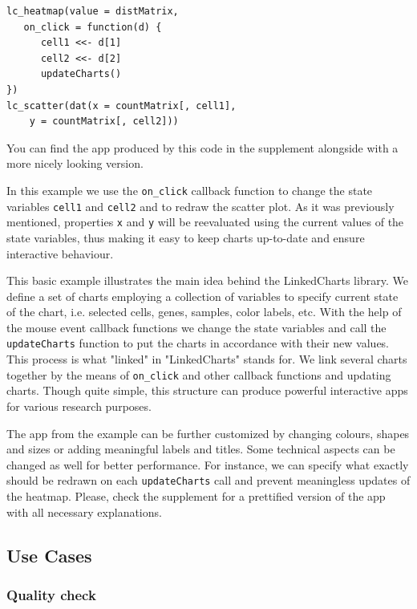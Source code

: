 \documentclass[twocolumn,10pt]{article}
\begin{document}
\begin{verbatim}
lc_heatmap(value = distMatrix, 
   on_click = function(d) {
      cell1 <<- d[1]
      cell2 <<- d[2]
      updateCharts()
})
lc_scatter(dat(x = countMatrix[, cell1],
	y = countMatrix[, cell2]))
\end{verbatim}

You can find the app produced by this code in the supplement alongside with a more nicely looking version.

In this example we use the \texttt{on_click} callback function to change the state variables \texttt{cell1} and \texttt{cell2} and to redraw the scatter plot. As it was previously mentioned, properties \texttt{x} and \texttt{y} will be reevaluated using the current values of the state variables, thus making it easy to keep charts up-to-date and ensure interactive behaviour.

This basic example illustrates the main idea behind the LinkedCharts library. We define a set of charts employing a collection of variables to specify current state of the chart, i.e. selected cells, genes, samples, color labels, etc. With the help of the mouse event callback functions we change the state variables and call the \texttt{updateCharts} function to put the charts in accordance with their new values. This process is what "linked" in "LinkedCharts" stands for. We link several charts together by the means of \texttt{on_click} and other callback functions and updating charts. Though quite simple, this structure can produce powerful interactive apps for various research purposes.

The app from the example can be further customized by changing colours, shapes and sizes or adding meaningful labels and titles. Some technical aspects can be changed as well for better performance. For instance, we can specify what exactly should be redrawn on each \texttt{updateCharts} call and prevent meaningless updates of the heatmap. Please, check the supplement for a prettified version of the app with all necessary explanations.

\subsection{Use Cases}
\subsubsection{Quality check}
\end{document}
